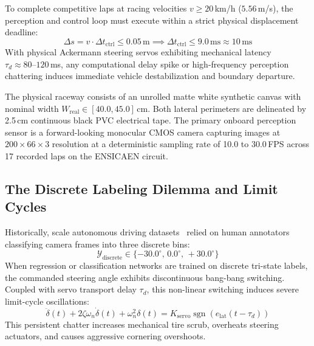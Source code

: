 \documentclass[10pt,journal,compsoc]{IEEEtran}
\begin{document}
To complete competitive laps at racing velocities $v \ge 20$\,km/h ($5.56$\,m/s), the perception and control loop must execute within a strict physical displacement deadline:
\begin{equation}
\Delta s = v \cdot \Delta t_{\text{ctrl}} \le 0.05\,\text{m} \implies \Delta t_{\text{ctrl}} \le 9.0\,\text{ms} \approx 10\,\text{ms}
\end{equation}
With physical Ackermann steering servos exhibiting mechanical latency $\tau_d \approx 80\text{--}120$\,ms, any computational delay spike or high-frequency perception chattering induces immediate vehicle destabilization and boundary departure.

The physical raceway consists of an unrolled matte white synthetic canvas with nominal width $W_{\text{real}} \in [40.0, 45.0]$\,cm. Both lateral perimeters are delineated by 2.5\,cm continuous black PVC electrical tape. The primary onboard perception sensor is a forward-looking monocular CMOS camera capturing images at $200 \times 66 \times 3$ resolution at a deterministic sampling rate of 10.0 to 30.0\,FPS across 17 recorded laps on the ENSICAEN circuit.

\subsection{The Discrete Labeling Dilemma and Limit Cycles}
Historically, scale autonomous driving datasets~\cite{palhano2026kart} relied on human annotators classifying camera frames into three discrete bins:
\begin{equation}
\mathcal{Y}_{\text{discrete}} \in \{-30.0^\circ, \, 0.0^\circ, \, +30.0^\circ\}
\end{equation}
When regression or classification networks are trained on discrete tri-state labels, the commanded steering angle exhibits discontinuous bang-bang switching. Coupled with servo transport delay $\tau_d$, this non-linear switching induces severe limit-cycle oscillations:
\begin{equation}
\ddot{\delta}(t) + 2\zeta\omega_n \dot{\delta}(t) + \omega_n^2 \delta(t) = K_{\text{servo}} \operatorname{sgn}\left(e_{\text{lat}}(t - \tau_d)\right)
\end{equation}
This persistent chatter increases mechanical tire scrub, overheats steering actuators, and causes aggressive cornering overshoots.
\end{document}
